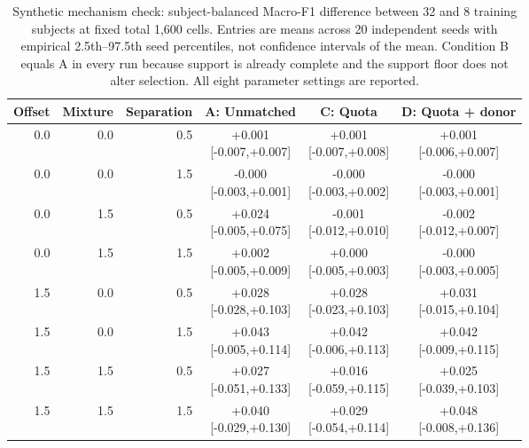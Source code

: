 \begin{table}[htbp]
\centering\small
\begin{tabular}{rrrccc}
\toprule
Offset & Mixture & Separation & A: Unmatched & C: Quota & D: Quota + donor \\
\midrule
0.0 & 0.0 & 0.5 & \shortstack{+0.001\\{}[-0.007,+0.007]} & \shortstack{+0.001\\{}[-0.007,+0.008]} & \shortstack{+0.001\\{}[-0.006,+0.007]} \\
0.0 & 0.0 & 1.5 & \shortstack{-0.000\\{}[-0.003,+0.001]} & \shortstack{-0.000\\{}[-0.003,+0.002]} & \shortstack{-0.000\\{}[-0.003,+0.001]} \\
0.0 & 1.5 & 0.5 & \shortstack{+0.024\\{}[-0.005,+0.075]} & \shortstack{-0.001\\{}[-0.012,+0.010]} & \shortstack{-0.002\\{}[-0.012,+0.007]} \\
0.0 & 1.5 & 1.5 & \shortstack{+0.002\\{}[-0.005,+0.009]} & \shortstack{+0.000\\{}[-0.005,+0.003]} & \shortstack{-0.000\\{}[-0.003,+0.005]} \\
1.5 & 0.0 & 0.5 & \shortstack{+0.028\\{}[-0.028,+0.103]} & \shortstack{+0.028\\{}[-0.023,+0.103]} & \shortstack{+0.031\\{}[-0.015,+0.104]} \\
1.5 & 0.0 & 1.5 & \shortstack{+0.043\\{}[-0.005,+0.114]} & \shortstack{+0.042\\{}[-0.006,+0.113]} & \shortstack{+0.042\\{}[-0.009,+0.115]} \\
1.5 & 1.5 & 0.5 & \shortstack{+0.027\\{}[-0.051,+0.133]} & \shortstack{+0.016\\{}[-0.059,+0.115]} & \shortstack{+0.025\\{}[-0.039,+0.103]} \\
1.5 & 1.5 & 1.5 & \shortstack{+0.040\\{}[-0.029,+0.130]} & \shortstack{+0.029\\{}[-0.054,+0.114]} & \shortstack{+0.048\\{}[-0.008,+0.136]} \\
\bottomrule
\end{tabular}
\caption{Synthetic mechanism check: subject-balanced Macro-F1 difference between 32 and 8 training subjects at fixed total 1,600 cells. Entries are means across 20 independent seeds with empirical 2.5th--97.5th seed percentiles, not confidence intervals of the mean. Condition B equals A in every run because support is already complete and the support floor does not alter selection. All eight parameter settings are reported.}
\label{tab:sequential_simulation}
\end{table}
